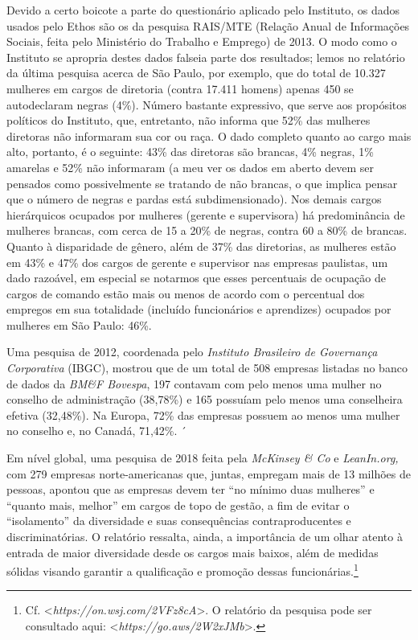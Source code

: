 Devido a certo boicote a parte do questionário aplicado pelo Instituto,
os dados usados pelo Ethos são os da pesquisa RAIS/MTE (Relação Anual de
Informações Sociais, feita pelo Ministério do Trabalho e Emprego) de
2013. O modo como o Instituto se apropria destes dados falseia parte dos
resultados; lemos no relatório da última pesquisa acerca de São Paulo,
por exemplo, que do total de 10.327 mulheres em cargos de diretoria
(contra 17.411 homens) apenas 450 se autodeclaram negras (4\%). Número
bastante expressivo, que serve aos propósitos políticos do Instituto,
que, entretanto, não informa que 52\% das mulheres diretoras não
informaram sua cor ou raça. O dado completo quanto ao cargo mais alto,
portanto, é o seguinte: 43\% das diretoras são brancas, 4\% negras, 1\%
amarelas e 52\% não informaram (a meu ver os dados em aberto devem ser
pensados como possivelmente se tratando de não brancas, o que implica
pensar que o número de negras e pardas está subdimensionado). Nos demais
cargos hierárquicos ocupados por mulheres (gerente e supervisora) há
predominância de mulheres brancas, com cerca de 15 a 20\% de negras,
contra 60 a 80\% de brancas. Quanto à disparidade de gênero, além de
37\% das diretorias, as mulheres estão em 43\% e 47\% dos cargos de
gerente e supervisor nas empresas paulistas, um dado razoável, em
especial se notarmos que esses percentuais de ocupação de cargos de
comando estão mais ou menos de acordo com o percentual dos empregos em
sua totalidade (incluído funcionários e aprendizes) ocupados por
mulheres em São Paulo: 46\%.

Uma pesquisa de 2012, coordenada pelo \emph{Instituto Brasileiro de
Governança Corporativa} (IBGC), mostrou que de um total de 508 empresas
listadas no banco de dados da \emph{BM\&F Bovespa}, 197 contavam com
pelo menos uma mulher no conselho de administração (38,78\%) e 165
possuíam pelo menos uma conselheira efetiva (32,48\%). Na Europa, 72\%
das empresas possuem ao menos uma mulher no conselho e, no Canadá,
71,42\%. ´

Em nível global, uma pesquisa de 2018 feita pela \emph{McKinsey \& Co} e
\emph{LeanIn.org,} com 279 empresas norte-americanas que, juntas,
empregam mais de 13 milhões de pessoas, apontou que as empresas devem
ter ``no mínimo duas mulheres'' e ``quanto mais, melhor'' em cargos de
topo de gestão, a fim de evitar o ``isolamento'' da diversidade e suas
consequências contraproducentes e discriminatórias. O relatório
ressalta, ainda, a importância de um olhar atento à entrada de maior
diversidade desde os cargos mais baixos, além de medidas sólidas visando
garantir a qualificação e promoção dessas funcionárias.\footnote{Cf.
  \textless{}\emph{https://on.wsj.com/2VFz8cA}\textgreater{}.
  O relatório da pesquisa pode ser consultado aqui:
  \textless{}\emph{https://go.aws/2W2xJMb}\textgreater{}.}

